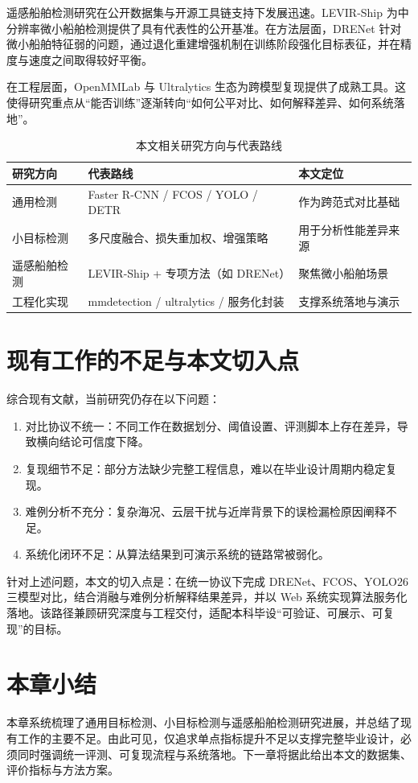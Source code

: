 遥感船舶检测研究在公开数据集与开源工具链支持下发展迅速。LEVIR-Ship 为中分辨率微小船舶检测提供了具有代表性的公开基准\cite{levirship2021_dataset}。在方法层面，DRENet 针对微小船舶特征弱的问题，通过退化重建增强机制在训练阶段强化目标表征，并在精度与速度之间取得较好平衡\cite{chen2022_tinyship_drenet}。

在工程层面，OpenMMLab 与 Ultralytics 生态为跨模型复现提供了成熟工具\cite{mmdet2018_openmmlab,ultralytics2024_docs}。这使得研究重点从“能否训练”逐渐转向“如何公平对比、如何解释差异、如何系统落地”。

\begin{table}[htbp]
  \centering
  \caption{本文相关研究方向与代表路线}
  \label{tab:ch2_research_map}
  \begin{tabular}{lll}
    \hline
    研究方向 & 代表路线 & 本文定位 \\
    \hline
    通用检测 & Faster R-CNN / FCOS / YOLO / DETR & 作为跨范式对比基础 \\
    小目标检测 & 多尺度融合、损失重加权、增强策略 & 用于分析性能差异来源 \\
    遥感船舶检测 & LEVIR-Ship + 专项方法（如 DRENet） & 聚焦微小船舶场景 \\
    工程化实现 & mmdetection / ultralytics / 服务化封装 & 支撑系统落地与演示 \\
    \hline
  \end{tabular}
\end{table}

\section{现有工作的不足与本文切入点}

综合现有文献，当前研究仍存在以下问题：

\begin{enumerate}
  \item 对比协议不统一：不同工作在数据划分、阈值设置、评测脚本上存在差异，导致横向结论可信度下降。
  \item 复现细节不足：部分方法缺少完整工程信息，难以在毕业设计周期内稳定复现。
  \item 难例分析不充分：复杂海况、云层干扰与近岸背景下的误检漏检原因阐释不足。
  \item 系统化闭环不足：从算法结果到可演示系统的链路常被弱化。
\end{enumerate}

针对上述问题，本文的切入点是：在统一协议下完成 DRENet、FCOS、YOLO26 三模型对比，结合消融与难例分析解释结果差异，并以 Web 系统实现算法服务化落地。该路径兼顾研究深度与工程交付，适配本科毕设“可验证、可展示、可复现”的目标。

\section{本章小结}

本章系统梳理了通用目标检测、小目标检测与遥感船舶检测研究进展，并总结了现有工作的主要不足。由此可见，仅追求单点指标提升不足以支撑完整毕业设计，必须同时强调统一评测、可复现流程与系统落地。下一章将据此给出本文的数据集、评价指标与方法方案。
